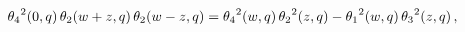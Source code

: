 \[{\mathop{\theta_{4}\/}\nolimits^{2}}\!\left(0,q\right)\mathop{\theta_{2}\/}%
\nolimits\!\left(w+z,q\right)\mathop{\theta_{2}\/}\nolimits\!\left(w-z,q\right%
)={\mathop{\theta_{4}\/}\nolimits^{2}}\!\left(w,q\right){\mathop{\theta_{2}\/}%
\nolimits^{2}}\!\left(z,q\right)-{\mathop{\theta_{1}\/}\nolimits^{2}}\!\left(w%
,q\right){\mathop{\theta_{3}\/}\nolimits^{2}}\!\left(z,q\right),\]
